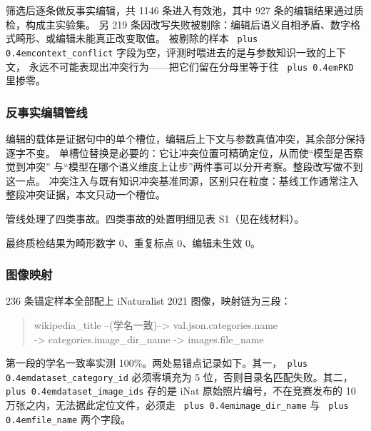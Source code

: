 \documentclass[10.5pt,compsoc,UTF8]{CjC}
\theoremstyle{mystyle}
\DeclareRobustCommand{\code}[1]{\texttt{\spaceskip=0pt plus 0.4em\relax#1}}
\DeclareRobustCommand{\codesplit}[1]{\texttt{\spaceskip=0pt plus 0.4em\relax#1}}
\begin{document}
筛选后逐条做反事实编辑，共 1146 条进入有效池，其中 927 条的编辑结果通过质检，构成主实验集。
另 219 条因改写失败被剔除：编辑后语义自相矛盾、数字格式畸形、或编辑未能真正改变取值。
被剔除的样本 \codesplit{c\allowbreak{}o\allowbreak{}n\allowbreak{}t\allowbreak{}e\allowbreak{}x\allowbreak{}t\allowbreak{}\_c\allowbreak{}o\allowbreak{}n\allowbreak{}f\allowbreak{}l\allowbreak{}i\allowbreak{}c\allowbreak{}t\allowbreak{}} 字段为空，评测时喂进去的是与参数知识一致的上下文，
永远不可能表现出冲突行为——把它们留在分母里等于往 \code{PKD} 里掺零。

\subsubsection{反事实编辑管线}
\label{sec:4-1-3}

编辑的载体是证据句中的单个槽位，编辑后上下文与参数真值冲突，其余部分保持逐字不变。
单槽位替换是必要的：它让冲突位置可精确定位，从而使“模型是否察觉到冲突”
与“模型在哪个语义维度上让步”两件事可以分开考察。整段改写做不到这一点。
冲突注入与既有知识冲突基准同源\cite{ref17,ref19}，区别只在粒度：基线工作通常注入
整段冲突证据，本文只动一个槽位。

管线处理了四类事故。四类事故的处置明细见表 S1（见在线材料）。

最终质检结果为畸形数字 0、重复标点 0、编辑未生效 0。

\subsubsection{图像映射}
\label{sec:4-1-4}

236 条锚定样本全部配上 iNaturalist 2021 图像，映射链为三段：

\begin{quote}\ttfamily\small
\noindent wikipedia\_title --(学名一致)--> val.json.categories.name\\
\noindent -> categories.image\_dir\_name -> images.file\_name
\end{quote}

第一段的学名一致率实测 100\%。两处易错点记录如下。其一，\codesplit{d\allowbreak{}a\allowbreak{}t\allowbreak{}a\allowbreak{}s\allowbreak{}e\allowbreak{}t\allowbreak{}\_c\allowbreak{}a\allowbreak{}t\allowbreak{}e\allowbreak{}g\allowbreak{}o\allowbreak{}r\allowbreak{}y\allowbreak{}\_i\allowbreak{}d\allowbreak{}}
必须零填充为 5 位，否则目录名匹配失败。其二，\codesplit{d\allowbreak{}a\allowbreak{}t\allowbreak{}a\allowbreak{}s\allowbreak{}e\allowbreak{}t\allowbreak{}\_i\allowbreak{}m\allowbreak{}a\allowbreak{}g\allowbreak{}e\allowbreak{}\_i\allowbreak{}d\allowbreak{}s\allowbreak{}} 存的是 iNat
原始照片编号，不在竞赛发布的 10 万张之内，无法据此定位文件，必须走 \code{image\_dir\_name}
与 \code{file\_name} 两个字段。
\end{document}
